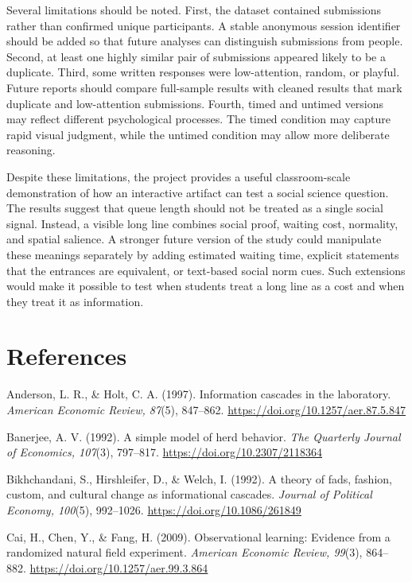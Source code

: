 \documentclass[stu,12pt,floatsintext]{apa7}
\begin{document}
Several limitations should be noted. First, the dataset contained submissions rather than confirmed unique participants. A stable anonymous session identifier should be added so that future analyses can distinguish submissions from people. Second, at least one highly similar pair of submissions appeared likely to be a duplicate. Third, some written responses were low-attention, random, or playful. Future reports should compare full-sample results with cleaned results that mark duplicate and low-attention submissions. Fourth, timed and untimed versions may reflect different psychological processes. The timed condition may capture rapid visual judgment, while the untimed condition may allow more deliberate reasoning.

Despite these limitations, the project provides a useful classroom-scale demonstration of how an interactive artifact can test a social science question. The results suggest that queue length should not be treated as a single social signal. Instead, a visible long line combines social proof, waiting cost, normality, and spatial salience. A stronger future version of the study could manipulate these meanings separately by adding estimated waiting time, explicit statements that the entrances are equivalent, or text-based social norm cues. Such extensions would make it possible to test when students treat a long line as a cost and when they treat it as information.

\section{References}

\begingroup
\setlength{\parindent}{-0.5in}
\setlength{\leftskip}{0.5in}
\setlength{\parskip}{0.7em}

\noindent Anderson, L. R., \& Holt, C. A. (1997). Information cascades in the laboratory. \textit{American Economic Review, 87}(5), 847--862. \url{https://doi.org/10.1257/aer.87.5.847}

\noindent Banerjee, A. V. (1992). A simple model of herd behavior. \textit{The Quarterly Journal of Economics, 107}(3), 797--817. \url{https://doi.org/10.2307/2118364}

\noindent Bikhchandani, S., Hirshleifer, D., \& Welch, I. (1992). A theory of fads, fashion, custom, and cultural change as informational cascades. \textit{Journal of Political Economy, 100}(5), 992--1026. \url{https://doi.org/10.1086/261849}

\noindent Cai, H., Chen, Y., \& Fang, H. (2009). Observational learning: Evidence from a randomized natural field experiment. \textit{American Economic Review, 99}(3), 864--882. \url{https://doi.org/10.1257/aer.99.3.864}
\end{document}
